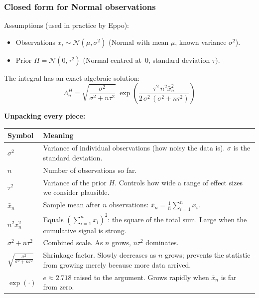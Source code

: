 \documentclass[12pt, a4paper]{article}
\newcommand{\LR}{\Lambda}              %
\begin{document}
\subsubsection*{Closed form for Normal observations}

Assumptions (used in practice by Eppo):
\begin{itemize}[nosep]
  \item Observations $x_i \sim \mathcal{N}(\mu, \sigma^2)$
        (Normal with mean $\mu$, known variance $\sigma^2$).
  \item Prior $H = \mathcal{N}(0, \tau^2)$ (Normal centred at~0,
        standard deviation $\tau$).
\end{itemize}

The integral has an exact algebraic solution:
\[
  \boxed{\LR_n^{H}
  = \sqrt{\frac{\sigma^2}{\sigma^2 + n\tau^2}}
    \;\exp\!\left(
      \frac{\tau^2\, n^2 \bar{x}_n^2}
           {2\,\sigma^2\,(\sigma^2 + n\tau^2)}
    \right)}
\]

\textbf{Unpacking every piece:}

\begin{center}
\renewcommand{\arraystretch}{1.4}
\begin{tabular}{@{} >{\raggedright}p{3cm} p{9cm} @{}}
\toprule
\textbf{Symbol} & \textbf{Meaning} \\
\midrule
$\sigma^2$ & Variance of individual observations (how noisy the data is).
  $\sigma$ is the standard deviation. \\
$n$ & Number of observations so far. \\
$\tau^2$ & Variance of the prior $H$.  Controls how wide a range of
  effect sizes we consider plausible. \\
$\bar{x}_n$ & Sample mean after $n$ observations:
  $\bar{x}_n = \frac{1}{n}\sum_{i=1}^n x_i$. \\
$n^2 \bar{x}_n^2$ & Equals $\left(\sum_{i=1}^n x_i\right)^2$: the square of
  the total sum.  Large when the cumulative signal is strong. \\
$\sigma^2 + n\tau^2$ & Combined scale.  As $n$ grows, $n\tau^2$ dominates. \\
$\sqrt{\frac{\sigma^2}{\sigma^2+n\tau^2}}$ & Shrinkage factor.  Slowly
  decreases as $n$ grows; prevents the statistic from growing merely because
  more data arrived. \\
$\exp(\cdot)$ & $e \approx 2.718$ raised to the argument.  Grows rapidly
  when $\bar{x}_n$ is far from zero. \\
\bottomrule
\end{tabular}
\end{center}
\end{document}
